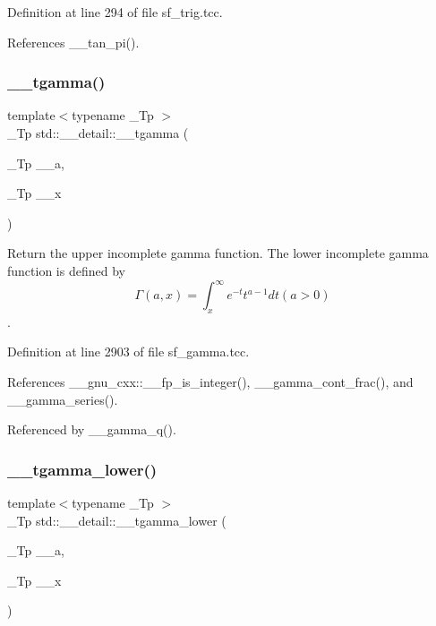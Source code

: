 Definition at line 294 of file sf\+\_\+trig.\+tcc.



References \+\_\+\+\_\+tan\+\_\+pi().

\mbox{\label{namespacestd_1_1____detail_ad2f6546e22348b07d992d522153d7d6b}} 
\subsubsection{\texorpdfstring{\+\_\+\+\_\+tgamma()}{\_\_tgamma()}}
{\footnotesize\ttfamily template$<$typename \+\_\+\+Tp $>$ \\
\+\_\+\+Tp std\+::\+\_\+\+\_\+detail\+::\+\_\+\+\_\+tgamma (\begin{DoxyParamCaption}\item[{\+\_\+\+Tp}]{\+\_\+\+\_\+a,  }\item[{\+\_\+\+Tp}]{\+\_\+\+\_\+x }\end{DoxyParamCaption})}



Return the upper incomplete gamma function. The lower incomplete gamma function is defined by \[ \Gamma(a,x) = \int_x^\infty e^{-t}t^{a-1}dt (a > 0) \]. 



Definition at line 2903 of file sf\+\_\+gamma.\+tcc.



References \+\_\+\+\_\+gnu\+\_\+cxx\+::\+\_\+\+\_\+fp\+\_\+is\+\_\+integer(), \+\_\+\+\_\+gamma\+\_\+cont\+\_\+frac(), and \+\_\+\+\_\+gamma\+\_\+series().



Referenced by \+\_\+\+\_\+gamma\+\_\+q().

\mbox{\label{namespacestd_1_1____detail_ad85ad5ffdb1bab9b1e3b6fd7a114fb0d}} 
\subsubsection{\texorpdfstring{\+\_\+\+\_\+tgamma\+\_\+lower()}{\_\_tgamma\_lower()}}
{\footnotesize\ttfamily template$<$typename \+\_\+\+Tp $>$ \\
\+\_\+\+Tp std\+::\+\_\+\+\_\+detail\+::\+\_\+\+\_\+tgamma\+\_\+lower (\begin{DoxyParamCaption}\item[{\+\_\+\+Tp}]{\+\_\+\+\_\+a,  }\item[{\+\_\+\+Tp}]{\+\_\+\+\_\+x }\end{DoxyParamCaption})}



